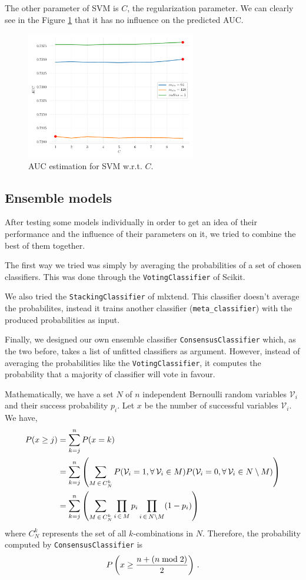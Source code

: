 The other parameter of SVM is $C$, the regularization parameter. We can clearly see in the Figure \ref{fig:svm-c} that it has no influence on the predicted AUC.

\begin{figure}[h]
    \centering
    \includegraphics[width=0.66\textwidth]{resources/pdf/svm-c.pdf}
    \caption{AUC estimation for SVM w.r.t. $C$.}
    \label{fig:svm-c}
\end{figure}

\subsection{Ensemble models}

After testing some models individually in order to get an idea of their performance and the influence of their parameters on it, we tried to combine the best of them together.

The first way we tried was simply by averaging the probabilities of a set of chosen classifiers. This was done through the \texttt{VotingClassifier} of Scikit.

We also tried the \texttt{StackingClassifier} of mlxtend. This classifier doesn't average the probabilites, instead it trains another classifier (\texttt{meta\_classifier}) with the produced probabilities as input.

Finally, we designed our own ensemble classifier \texttt{ConsensusClassifier} which, as the two before, takes a list of unfitted classifiers as argument. However, instead of averaging the probabilities like the \texttt{VotingClassifier}, it computes the probability that a majority of classifier will vote \og{}in favour\fg{}.

Mathematically, we have a set $N$ of $n$ independent Bernoulli random variables $\mathcal{V}_i$ and their success probability $p_i$. Let $x$ be the number of successful variables $\mathcal{V}_i$. We have,
\begin{align*}
    P(x \geq j) & = \sum_{k = j}^{n} P(x = k) \\
    & = \sum_{k = j}^{n} \left( \sum_{M \, \in \, C^k_N} P(\mathcal{V}_i = 1, \forall \, \mathcal{V}_i \in M) P(\mathcal{V}_i = 0,  \forall \, \mathcal{V}_i \in N \setminus M)\right) \\
    & = \sum_{k = j}^{n} \left( \sum_{M \, \in \, C^k_N} \prod_{i \, \in \, M} p_i \prod_{i \, \in \, N \setminus M} (1 - p_i) \right)
\end{align*}
where $C^k_N$ represents the set of all $k$-combinations in $N$. Therefore, the probability computed by \texttt{ConsensusClassifier} is $$P\left(x \geq \frac{n + (n \bmod 2)}{2}\right) \, .$$

